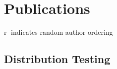 \documentclass[12pt,letterpaper]{report}
\begin{document}
	\section*{Publications}
	\textcircled{r} indicates random author ordering
	\subsection*{Distribution Testing}
\end{document}
